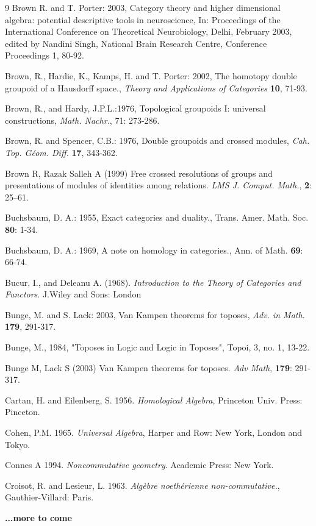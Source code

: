 \documentclass[12pt]{article}
\begin{document}
\begin{thebibliography} {9}
Brown R. and T. Porter: 2003, Category theory and higher
dimensional algebra: potential descriptive tools in neuroscience, In:
Proceedings of the International Conference on Theoretical
Neurobiology, Delhi, February 2003, edited by Nandini Singh,
National Brain Research Centre, Conference Proceedings 1, 80-92.

Brown, R., Hardie, K., Kamps, H. and T. Porter: 2002, The homotopy
double groupoid of a Hausdorff space., \emph{Theory and
Applications of Categories} \textbf{10}, 71-93.

Brown, R., and Hardy, J.P.L.:1976, Topological groupoids I:
universal constructions, \emph{Math. Nachr.}, 71: 273-286.

Brown, R. and Spencer, C.B.: 1976, Double groupoids and crossed
modules, \emph{Cah.  Top. G\'{e}om. Diff.} \textbf{17}, 343-362.

Brown R, Razak Salleh A (1999) Free crossed resolutions of groups and presentations of modules of
identities among relations. {\em LMS J. Comput. Math.}, \textbf{2}: 25--61.

Buchsbaum, D. A.: 1955, Exact categories and duality., Trans. Amer. Math. Soc. \textbf{80}: 1-34.

Buchsbaum, D. A.: 1969, A note on homology in categories., Ann. of Math. \textbf{69}: 66-74.

Bucur, I., and Deleanu A. (1968). {\em  Introduction to the Theory of Categories and Functors}. J.Wiley and Sons: London

Bunge, M. and S. Lack: 2003, Van Kampen theorems for toposes, \emph{Adv. in Math.} \textbf{179}, 291-317.


Bunge, M., 1984, "Toposes in Logic and Logic in Toposes", Topoi, 3, no. 1, 13-22. 

Bunge M, Lack S (2003) Van Kampen theorems for toposes. {\em Adv Math}, \textbf {179}: 291-317.

Cartan, H. and Eilenberg, S. 1956. {\em Homological Algebra}, Princeton Univ. Press: Pinceton. 


Cohen, P.M. 1965. {\em Universal Algebra}, Harper and Row: New York, London and Tokyo.

Connes A 1994. \emph{Noncommutative geometry}. Academic Press: New York.

Croisot, R. and Lesieur, L. 1963. \emph{Alg\`ebre noeth\'erienne non-commutative.},
Gauthier-Villard: Paris.

\end{thebibliography}

\textbf{...more to come}

\end{document}
